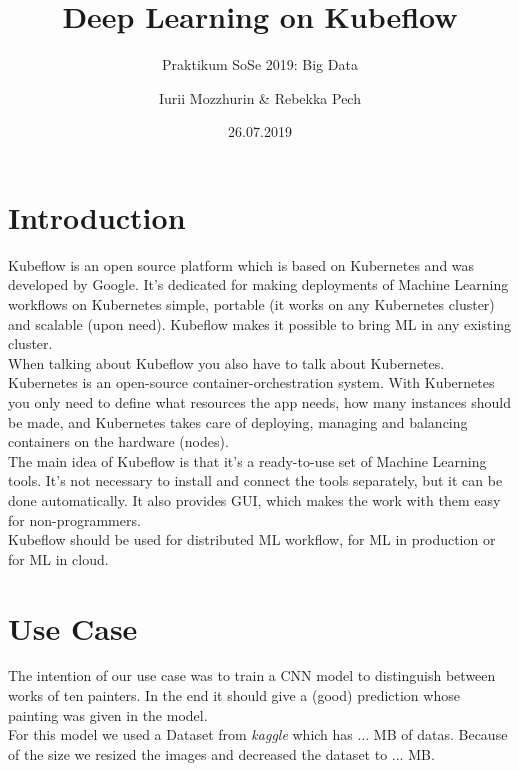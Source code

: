 \documentclass[12pt,a4paper]{scrartcl}		%
\begin{document}
\title{\LARGE Deep Learning on Kubeflow}
\subtitle{\large Praktikum SoSe 2019: Big Data}
\date{26.07.2019}
\author{ \large Iurii Mozzhurin \& Rebekka Pech}
\maketitle



\section{Introduction}

\noindent Kubeflow is an open source platform which is based on Kubernetes and was developed by Google. It's dedicated for making deployments of Machine Learning workflows on Kubernetes simple, portable (it works on any Kubernetes cluster) and scalable (upon need). Kubeflow makes it possible to bring ML in any existing cluster. \\

\noindent When talking about Kubeflow you also have to talk about Kubernetes. Kubernetes is an open-source container-orchestration system. With Kubernetes you only need to define what resources the app needs, how many instances should be made, and Kubernetes takes care of deploying, managing and balancing containers on the hardware (nodes).\\  

\noindent The main idea of Kubeflow is that it's a ready-to-use set of Machine Learning tools. It's not necessary to install and connect the tools separately, but it can be done automatically. It also provides GUI, which makes the work with them easy for non-programmers.\\
 Kubeflow should be used for distributed ML workflow, for ML in production or for ML in cloud.
\section{Use Case}

\noindent The intention of our use case was to train a CNN model to distinguish between works of ten painters. In the end it should give a (good) prediction whose painting was given in the model. \\
For this model we used a Dataset from \textit{kaggle} which has ... MB of datas. Because of the size we resized the images and decreased the dataset to ... MB.\\
\end{document}
